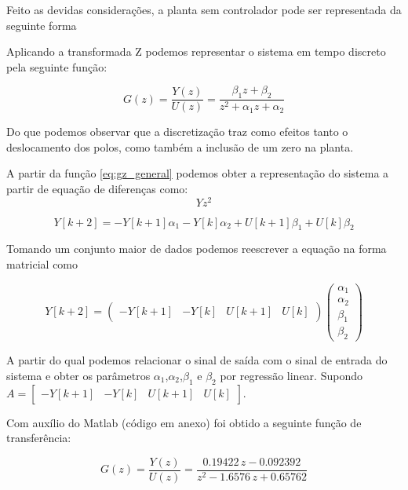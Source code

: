 \documentclass[a4paper,11pt]{article}
\begin{document}
Feito as devidas considerações, a planta sem controlador pode ser representada da seguinte forma


Aplicando a transformada Z podemos representar o sistema em tempo discreto pela seguinte função:

\begin{equation}\label{eq:gz_general}
    G(z) = \frac{Y(z)}{U(z)} = \frac{\beta_1 z + \beta_2}{z^2 + \alpha_1 z + \alpha_2}
\end{equation}

Do que podemos observar que a discretização traz como efeitos tanto o deslocamento dos polos, como também a inclusão de um zero na planta.

A partir da função \ref{eq:gz_general} podemos obter a representação do sistema a partir de equação de diferenças como:
$$
Y z^2
$$

\begin{equation}\label{eq:gz_general}
  Y[k+2] = -Y[k+1]\alpha_1 - Y[k]\alpha_2 + U[k+1]\beta_1 + U[k]\beta_2
\end{equation}

Tomando um conjunto maior de dados podemos reescrever a equação na forma matricial como

\begin{equation}\label{eq:gz_general}
  Y[k+2] = 
  \left( \begin{array}{cccc}
  -Y[k+1] & -Y[k] & U[k+1] & U[k]
  \end{array} \right)
  \left(\begin{array}{c}
    \alpha_1\\ \alpha_2 \\ \beta_1 \\ \beta_2
  \end{array}\right)
\end{equation}

A partir do qual podemos relacionar o sinal de saída com o sinal de entrada do sistema e obter os parâmetros $\alpha_1$,$\alpha_2$,$\beta_1$ e $\beta_2$ por regressão linear. Supondo 
$A = \left[\begin{array}{cccc}
 -Y[k+1] & -Y[k] & U[k+1] & U[k]
\end{array}\right]$.

Com auxílio do Matlab (código em anexo) foi obtido a seguinte função de transferência:

\begin{equation}
G(z) = \frac{Y(z)}{U(z)} = \frac{0.19422\,z-0.092392}{z^2-1.6576\,z+0.65762}
\end{equation}
\end{document}
